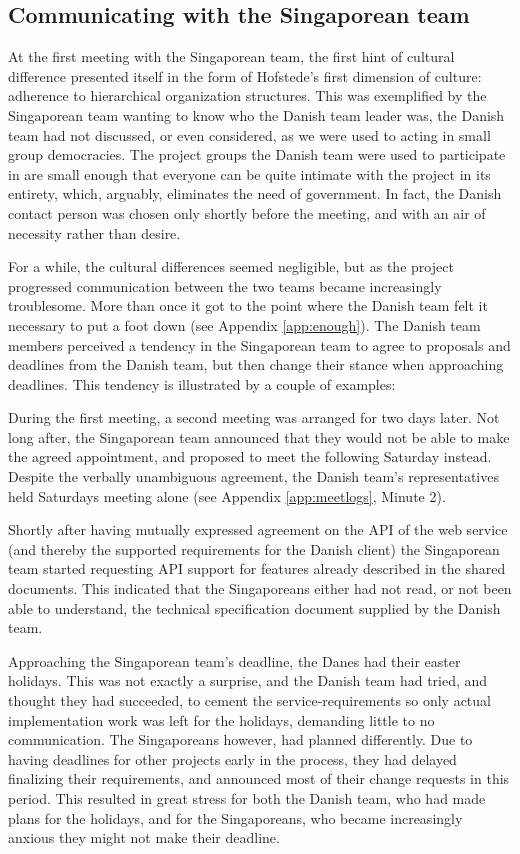 \subsection{Communicating with the Singaporean team}
\label{sec:communicating}

At the first meeting with the Singaporean team, the first hint of cultural
difference presented itself in the form of Hofstede's first dimension of
culture: adherence to hierarchical organization structures\cite{surprises}.
This was exemplified by the Singaporean team wanting to know who the Danish
team leader was, the Danish team had not discussed, or even considered, as we
were used to acting in small group democracies. The project groups the Danish
team were used to participate in are small enough that everyone can be quite
intimate with the project in its entirety, which, arguably, eliminates the need
of government. In fact, the Danish contact person was chosen only shortly
before the meeting, and with an air of necessity rather than desire.

For a while, the cultural differences seemed negligible, but as the project
progressed communication between the two teams became increasingly troublesome.
More than once it got to the point where the Danish team felt it necessary to
put a foot down (see Appendix \ref{app:enough}). The Danish team members perceived a tendency
in the Singaporean team to agree to
proposals and deadlines from the Danish team, but then change their stance when
approaching deadlines. This tendency is illustrated by a couple of examples:

During the first meeting, a second meeting was arranged for two days later. Not
long after, the Singaporean team announced that they would not be able to make
the agreed appointment, and proposed to meet the following Saturday instead.
Despite the verbally unambiguous agreement, the Danish team's
representatives held Saturdays meeting alone (see Appendix \ref{app:meetlogs},
Minute 2).

Shortly after having mutually expressed
agreement on the API of the web service (and thereby the supported requirements
for the Danish client) the Singaporean team started requesting API support for
features already described in the shared documents.
This indicated that the Singaporeans either had not read, or not been able to
understand, the technical specification document supplied by the Danish team.

Approaching the Singaporean team's deadline, the Danes had their easter
holidays. This was not exactly a surprise, and the Danish team had tried, and
thought they had succeeded, to cement the service-requirements so only actual
implementation work was left for the holidays, demanding little to no
communication. The Singaporeans however, had planned differently. Due to having
deadlines for other projects early in the process, they had delayed finalizing
their requirements, and announced most of their change requests in this period.
This resulted in great stress for both the Danish team, who had made plans for
the holidays, and for the Singaporeans, who became increasingly anxious they
might not make their deadline.

